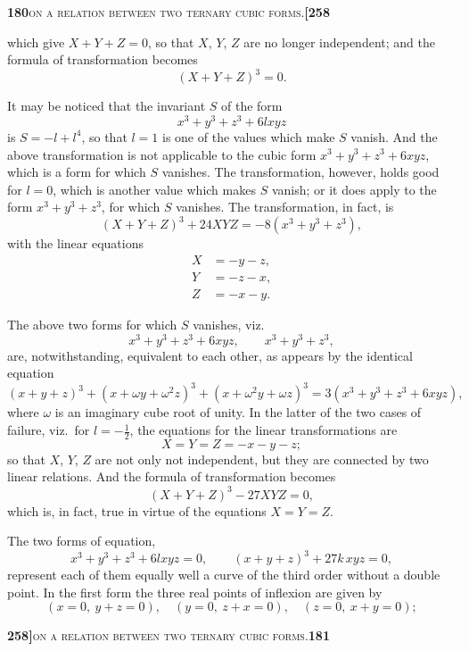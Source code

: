 \documentclass[11pt]{article}
\begin{document}
\newpage

\noindent\textbf{180}\hfill\textsc{on a relation between two ternary cubic forms.}\hfill\textbf{[258}

\medskip

\noindent which give $X + Y + Z = 0$, so that $X$, $Y$, $Z$ are no longer independent; and the formula of transformation becomes
\[
(X + Y + Z)^3 = 0.
\]

It may be noticed that the invariant $S$ of the form
\[
x^3 + y^3 + z^3 + 6lxyz
\]
is $S = -l + l^4$, so that $l = 1$ is one of the values which make $S$ vanish. And the above transformation is not applicable to the cubic form $x^3 + y^3 + z^3 + 6xyz$, which is a form for which $S$ vanishes. The transformation, however, holds good for $l = 0$, which is another value which makes $S$ vanish; or it does apply to the form $x^3 + y^3 + z^3$, for which $S$ vanishes. The transformation, in fact, is
\[
(X + Y + Z)^3 + 24 XYZ = -8(x^3 + y^3 + z^3),
\]
with the linear equations
\[
\begin{aligned}
X &= -y - z,\\
Y &= -z - x,\\
Z &= -x - y.
\end{aligned}
\]

The above two forms for which $S$ vanishes, viz.
\[
x^3 + y^3 + z^3 + 6xyz,\qquad x^3 + y^3 + z^3,
\]
are, notwithstanding, equivalent to each other, as appears by the identical equation
\[
(x + y + z)^3 + (x + \omega y + \omega^2 z)^3 + (x + \omega^2 y + \omega z)^3 = 3(x^3 + y^3 + z^3 + 6xyz),
\]
where $\omega$ is an imaginary cube root of unity. In the latter of the two cases of failure, viz.\ for $l = -\tfrac{1}{2}$, the equations for the linear transformations are
\[
X = Y = Z = -x - y - z;
\]
so that $X$, $Y$, $Z$ are not only not independent, but they are connected by two linear relations. And the formula of transformation becomes
\[
(X + Y + Z)^3 - 27 XYZ = 0,
\]
which is, in fact, true in virtue of the equations $X = Y = Z$.

The two forms of equation,
\[
x^3 + y^3 + z^3 + 6lxyz = 0,\qquad (x + y + z)^3 + 27k\,xyz = 0,
\]
represent each of them equally well a curve of the third order without a double point. In the first form the three real points of inflexion are given by
\[
(x = 0,\ y + z = 0),\quad (y = 0,\ z + x = 0),\quad (z = 0,\ x + y = 0);
\]

\newpage

\noindent\textbf{258]}\hfill\textsc{on a relation between two ternary cubic forms.}\hfill\textbf{181}
\end{document}
